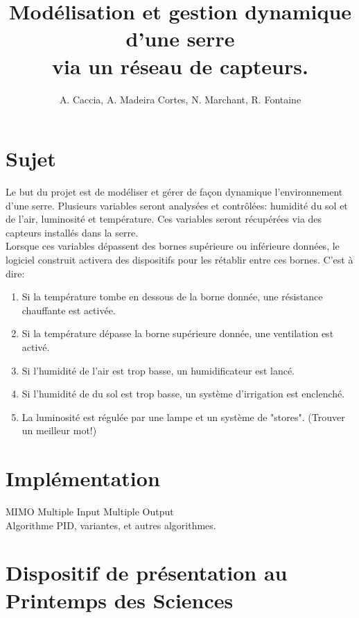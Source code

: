 \documentclass[a4paper,10pt]{article}
\title{Modélisation et gestion dynamique d'une serre\\ via un réseau de capteurs.}
\author{A. Caccia, A. Madeira Cortes, N. Marchant, R. Fontaine}
\date{ }
\begin{document}
\maketitle

\vspace{2cm}

\section{Sujet}

Le but du projet est de modéliser et gérer de façon dynamique l'environnement d'une serre. Plusieurs variables seront analysées et contrôlées: humidité du sol et de l'air, luminosité et température. Ces variables seront récupérées via des capteurs installés dans la serre. \\

Lorsque ces variables dépassent des bornes supérieure ou inférieure données, le logiciel construit activera des dispositifs pour les rétablir entre ces bornes. C'est à dire: \\

\begin{enumerate}
	\item Si la température tombe en dessous de la borne donnée, une résistance chauffante est activée.
	\item Si la température dépasse la borne supérieure donnée, une ventilation est activé.
	\item Si l'humidité de l'air est trop basse, un humidificateur est lancé.
	\item Si l'humidité de du sol est trop basse, un système d'irrigation est enclenché.
	\item La luminosité est régulée par une lampe et un système de "stores". (Trouver un meilleur mot!)\\
\end{enumerate}

\section{Implémentation}

MIMO Multiple Input Multiple Output \\

Algorithme PID, variantes, et autres algorithmes.\\

\section{Dispositif de présentation au Printemps des Sciences}
\end{document}
